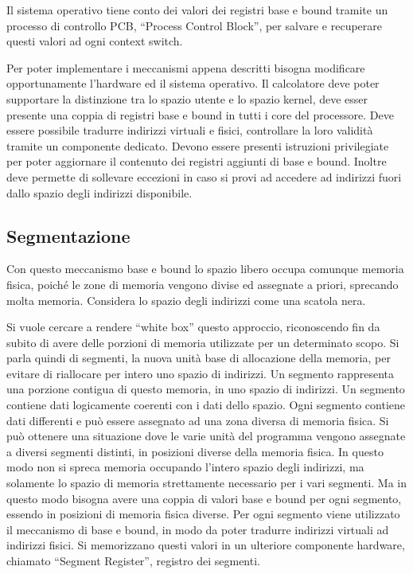 \documentclass{article}
\numberwithin{equation}{subsection}
\begin{document}
Il sistema operativo tiene conto dei valori dei registri base e bound tramite un processo di controllo PCB, ``Process Control Block'', per salvare e recuperare questi 
valori ad ogni context switch. 

Per poter implementare i meccanismi appena descritti bisogna modificare opportunamente l'hardware ed il sistema operativo. 
Il calcolatore deve poter supportare la distinzione tra lo spazio utente e lo spazio kernel, deve esser presente una coppia di registri base e bound 
in tutti i core del processore. Deve essere possibile tradurre indirizzi virtuali e fisici, controllare la loro validità tramite un componente dedicato. Devono essere 
presenti istruzioni privilegiate per poter aggiornare il contenuto dei registri aggiunti di base e bound. Inoltre deve permette di sollevare eccezioni in caso si provi 
ad accedere ad indirizzi fuori dallo spazio degli indirizzi disponibile.  

\subsection{Segmentazione}

Con questo meccanismo base e bound lo spazio libero occupa comunque memoria fisica, poiché le zone di memoria vengono divise ed assegnate a priori, sprecando molta 
memoria. Considera lo spazio degli indirizzi come una scatola nera. 

Si vuole cercare a rendere ``white box'' questo approccio, riconoscendo fin da subito di avere delle porzioni di memoria utilizzate per un determinato scopo. Si parla 
quindi di segmenti, la nuova unità base di allocazione della memoria, per evitare di riallocare per intero uno spazio di indirizzi. Un segmento rappresenta una porzione 
contigua di questo memoria, in uno spazio di indirizzi. Un segmento contiene dati logicamente coerenti con i dati dello spazio. Ogni segmento contiene dati differenti 
e può essere assegnato ad una zona diversa di memoria fisica. Si può ottenere una situazione dove le varie unità del programma vengono assegnate a diversi 
segmenti distinti, in posizioni diverse della memoria fisica. In questo modo non si spreca memoria occupando l'intero spazio degli indirizzi, ma solamente lo spazio 
di memoria strettamente necessario per i vari segmenti. Ma in questo modo bisogna avere una coppia di valori base e bound per ogni segmento, essendo in posizioni di 
memoria fisica diverse. Per ogni segmento viene utilizzato il meccanismo di base e bound, in modo da poter tradurre indirizzi virtuali ad indirizzi fisici. Si 
memorizzano questi valori in un ulteriore componente hardware, chiamato ``Segment Register'', registro dei segmenti. 
\end{document}
